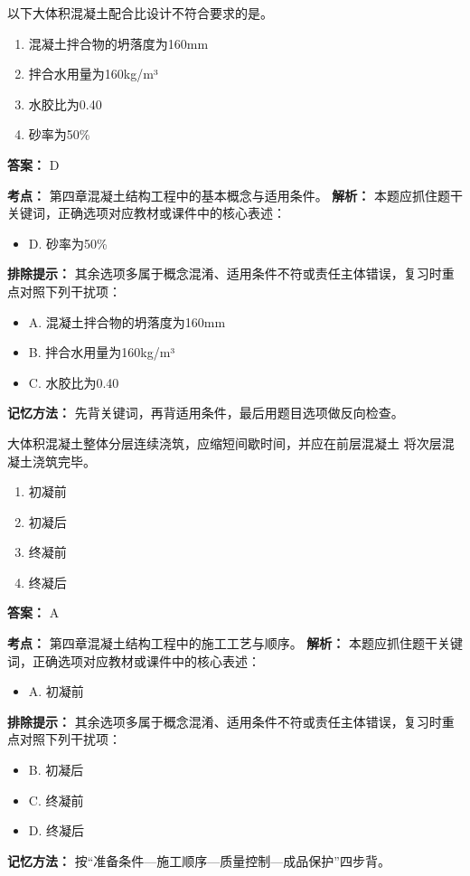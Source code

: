 \documentclass[UTF8,fontset=fandol,11pt]{ctexart}
\begin{document}
\begin{quizbox}[title={第 86 题}]
以下大体积混凝土配合比设计不符合要求的是。\\
\begin{enumerate}[label=\Alph*.]
\item 混凝土拌合物的坍落度为160mm
\item 拌合水用量为160kg/m³
\item 水胶比为0.40
\item 砂率为50\%
\end{enumerate}
\textbf{答案：} D
\vspace{0.25em}
\begin{answerbox}[title={考点解析}]
\textbf{考点：} 第四章混凝土结构工程中的基本概念与适用条件。
\textbf{解析：} 本题应抓住题干关键词，正确选项对应教材或课件中的核心表述：
\begin{itemize}
\item D. 砂率为50\%
\end{itemize}
\textbf{排除提示：} 其余选项多属于概念混淆、适用条件不符或责任主体错误，复习时重点对照下列干扰项：
\begin{itemize}
\item A. 混凝土拌合物的坍落度为160mm
\item B. 拌合水用量为160kg/m³
\item C. 水胶比为0.40
\end{itemize}
\textbf{记忆方法：} 先背关键词，再背适用条件，最后用题目选项做反向检查。
\end{answerbox}
\end{quizbox}

\begin{quizbox}[title={第 87 题}]
大体积混凝土整体分层连续浇筑，应缩短间歇时间，并应在前层混凝土 将次层混凝土浇筑完毕。\\
\begin{enumerate}[label=\Alph*.]
\item 初凝前
\item 初凝后
\item 终凝前
\item 终凝后
\end{enumerate}
\textbf{答案：} A
\vspace{0.25em}
\begin{answerbox}[title={考点解析}]
\textbf{考点：} 第四章混凝土结构工程中的施工工艺与顺序。
\textbf{解析：} 本题应抓住题干关键词，正确选项对应教材或课件中的核心表述：
\begin{itemize}
\item A. 初凝前
\end{itemize}
\textbf{排除提示：} 其余选项多属于概念混淆、适用条件不符或责任主体错误，复习时重点对照下列干扰项：
\begin{itemize}
\item B. 初凝后
\item C. 终凝前
\item D. 终凝后
\end{itemize}
\textbf{记忆方法：} 按“准备条件—施工顺序—质量控制—成品保护”四步背。
\end{answerbox}
\end{quizbox}
\end{document}
